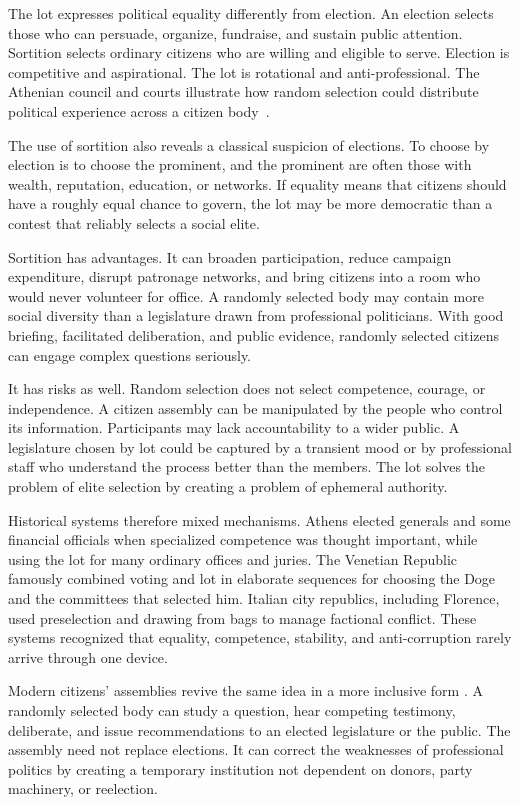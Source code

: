 ﻿\documentclass[12pt,a4paper]{book}
\begin{document}
The lot expresses political equality differently from election.  An election
selects those who can persuade, organize, fundraise, and sustain public
attention.  Sortition selects ordinary citizens who are willing and eligible
to serve.  Election is competitive and aspirational.  The lot is rotational
and anti-professional.  The Athenian council and courts illustrate how
random selection could distribute political experience across a citizen
body~\cite{dow_aristotlekleroteria_1939}.

The use of sortition also reveals a classical suspicion of elections.  To
choose by election is to choose the prominent, and the prominent are often
those with wealth, reputation, education, or networks.  If equality means
that citizens should have a roughly equal chance to govern, the lot may be
more democratic than a contest that reliably selects a social elite.

Sortition has advantages.  It can broaden participation, reduce campaign
expenditure, disrupt patronage networks, and bring citizens into a room who
would never volunteer for office.  A randomly selected body may contain
more social diversity than a legislature drawn from professional politicians.
With good briefing, facilitated deliberation, and public evidence, randomly
selected citizens can engage complex questions seriously.

It has risks as well.  Random selection does not select competence, courage,
or independence.  A citizen assembly can be manipulated by the people who
control its information.  Participants may lack accountability to a wider
public.  A legislature chosen by lot could be captured by a transient mood
or by professional staff who understand the process better than the members.
The lot solves the problem of elite selection by creating a problem of
ephemeral authority.

Historical systems therefore mixed mechanisms.  Athens elected generals
and some financial officials when specialized competence was thought
important, while using the lot for many ordinary offices and juries.  The
Venetian Republic famously combined voting and lot in elaborate sequences
for choosing the Doge and the committees that selected him.  Italian city
republics, including Florence, used preselection and drawing from bags to
manage factional conflict.  These systems recognized that equality,
competence, stability, and anti-corruption rarely arrive through one device.

Modern citizens' assemblies revive the same idea in a more inclusive form
\cite{Sintomer2016,Bouricius2013}.
A randomly selected body can study a question, hear competing testimony,
deliberate, and issue recommendations to an elected legislature or the
public.  The assembly need not replace elections.  It can correct the
weaknesses of professional politics by creating a temporary institution not
dependent on donors, party machinery, or reelection.
\end{document}
